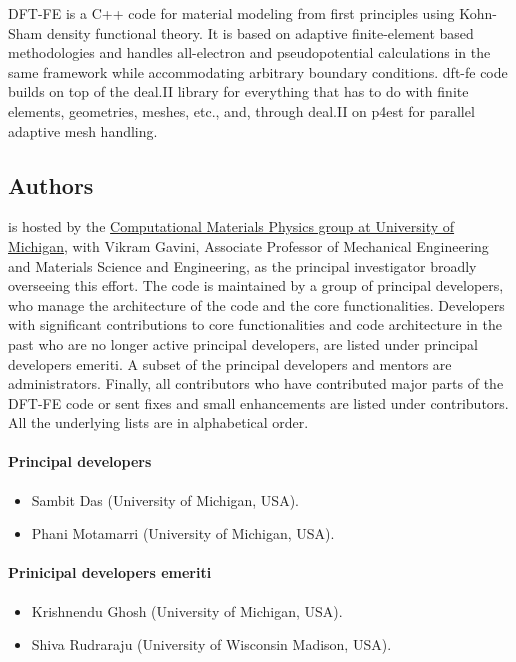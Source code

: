 DFT-FE is a C++ code for material modeling from first principles using Kohn-Sham density functional theory.
It is based on adaptive finite-element based methodologies and handles all-electron and pseudopotential calculations in the 
same framework while accommodating arbitrary boundary conditions. dft-fe code builds on top of the deal.II library for everything 
that has to do with finite elements, geometries, meshes, etc., and, through deal.II on p4est for parallel adaptive mesh handling.

\subsection{Authors}
\label{sec:authors}
\dftfe{} is hosted by the \href{http://www-personal.umich.edu/~vikramg/}{Computational Materials Physics
group at University of Michigan}, with Vikram Gavini, Associate Professor of Mechanical Engineering and Materials Science and Engineering, as
the principal investigator broadly overseeing this effort. The code is maintained by a group of principal developers, 
who manage the architecture of the code and the core functionalities. Developers with
significant contributions to core functionalities and code architecture in the past who are 
no longer active principal developers, are listed under principal developers emeriti. 
A subset of the principal developers and mentors are administrators. Finally, all contributors who have
contributed major parts of the DFT-FE code or sent fixes and small enhancements are listed
under contributors. All the underlying lists are in alphabetical order. 

\paragraph{Principal developers}
\begin{itemize}
	\item Sambit Das (University of Michigan, USA).
	\item Phani Motamarri (University of Michigan, USA).
\end{itemize}

\paragraph{Prinicipal developers emeriti}
\begin{itemize}
	\item Krishnendu Ghosh (University of Michigan, USA).
	\item Shiva Rudraraju (University of Wisconsin Madison, USA).	
\end{itemize}


